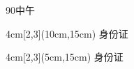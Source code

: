 \documentclass[11pt,a4paper]{article}
\begin{document}
	90中午
	\pagestyle{empty}
	
\begin{textblock*}{4cm}[2,3](10cm,15cm)
身份证
\end{textblock*}

\begin{textblock*}{4cm}[2,3](5cm,15cm)
	身份证
\end{textblock*}
\end{document}
